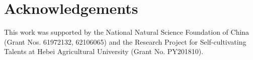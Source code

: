 \documentclass[10pt,twocolumn,letterpaper]{article}
\begin{document}
\section*{Acknowledgements}
This work was supported by the National Natural Science Foundation of China (Grant Nos. 61972132, 62106065) and the Research Project for Self-cultivating Talents at Hebei Agricultural University (Grant No. PY201810).



\clearpage
{\small


}
\end{document}
